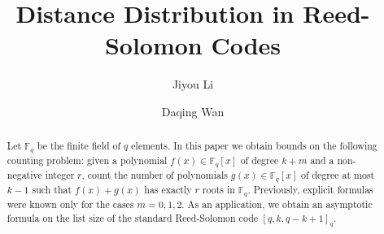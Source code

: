\documentclass[reqno]{amsart}
\theoremstyle{remark}
\numberwithin{equation}{section}
\newcommand{\f}{\mathbb{F}_q}
\begin{document}
\title{Distance Distribution in Reed-Solomon Codes}

\author{Jiyou Li}
\address{Department of Mathematics, Shanghai Jiao Tong University, Shanghai, P.R. China}


\author{Daqing Wan}
\address{Department of Mathematics, University of California, Irvine, CA 92697-3875, USA}
%



\begin{abstract}
Let $\f$ be the finite field of $q$ elements.
In this paper we obtain bounds on the following counting problem: given a polynomial $f(x)\in \f[x]$ of degree $k+m$ and a non-negative integer $r$, count the number of polynomials $g(x)\in \f[x]$ of degree at most $k-1$ such that $f(x)+g(x)$ has exactly $r$ roots in $\f$.
Previously, explicit formulas were known only for the cases $m=0, 1, 2$.
As an application, we obtain an asymptotic formula  on the list size of  the standard Reed-Solomon code $[q, k, q-k+1]_q$.
%

%
%
%


\end{abstract}
\end{document}
